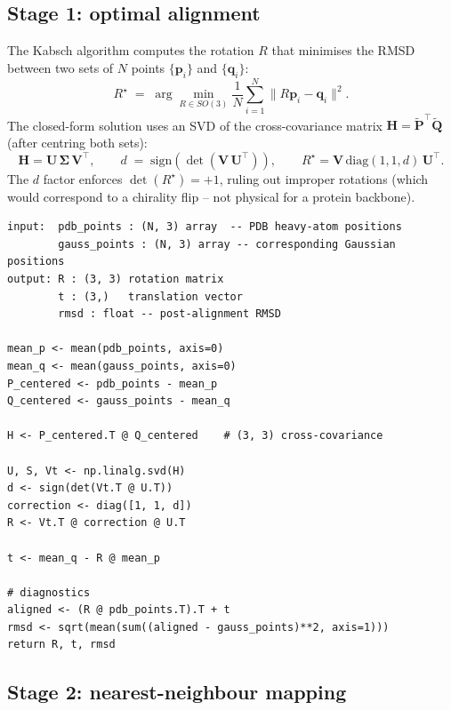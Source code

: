 \documentclass[10pt,a4paper,twoside]{article}
\newcommand{\Umat}{\mathbf{U}}
\newcommand{\Vmat}{\mathbf{V}}
\newcommand{\Smat}{\boldsymbol{\Sigma}}
\newcommand{\fn}[1]{\texttt{#1}}
\begin{document}
\subsection{Stage 1: optimal alignment}

The Kabsch algorithm computes the rotation $R$ that minimises the
RMSD between two sets of $N$ points $\{\mathbf{p}_i\}$ and
$\{\mathbf{q}_i\}$:
\begin{equation}
  R^\star \;=\; \arg\min_{R \in SO(3)}
                 \frac{1}{N}\sum_{i=1}^{N}
                 \lVert R\mathbf{p}_i - \mathbf{q}_i\rVert^2.
\end{equation}
The closed-form solution uses an SVD of the cross-covariance matrix
$\mathbf{H} = \tilde{\mathbf{P}}^\top \tilde{\mathbf{Q}}$
(after centring both sets):
\begin{equation}
  \mathbf{H} = \Umat\,\Smat\,\Vmat^\top,
  \qquad
  d \;=\; \text{sign}(\det(\Vmat\,\Umat^\top)),
  \qquad
  R^\star = \Vmat\,\text{diag}(1, 1, d)\,\Umat^\top.
\end{equation}
The $d$ factor enforces $\det(R^\star) = +1$, ruling out
improper rotations (which would correspond to a chirality flip --
not physical for a protein backbone).

\begin{lstlisting}[style=pseudo,
  caption={Kabsch optimal-rotation algorithm. Implementation:
           \protect\fn{geometry.kabsch\_align}.}]
input:  pdb_points : (N, 3) array  -- PDB heavy-atom positions
        gauss_points : (N, 3) array -- corresponding Gaussian positions
output: R : (3, 3) rotation matrix
        t : (3,)   translation vector
        rmsd : float -- post-alignment RMSD

mean_p <- mean(pdb_points, axis=0)
mean_q <- mean(gauss_points, axis=0)
P_centered <- pdb_points - mean_p
Q_centered <- gauss_points - mean_q

H <- P_centered.T @ Q_centered    # (3, 3) cross-covariance

U, S, Vt <- np.linalg.svd(H)
d <- sign(det(Vt.T @ U.T))
correction <- diag([1, 1, d])
R <- Vt.T @ correction @ U.T

t <- mean_q - R @ mean_p

# diagnostics
aligned <- (R @ pdb_points.T).T + t
rmsd <- sqrt(mean(sum((aligned - gauss_points)**2, axis=1)))
return R, t, rmsd
\end{lstlisting}

\subsection{Stage 2: nearest-neighbour mapping}
\end{document}

